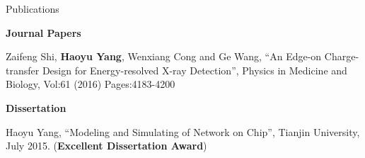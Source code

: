 \begin{rSection}{Publications}


\textbf{Journal Papers}
\begin{description}[font=\normalfont]
\item[{[J1]}]{
    Zaifeng Shi, \textbf{Haoyu Yang}, Wenxiang Cong and Ge Wang,
    ``An Edge-on Charge-transfer Design for Energy-resolved X-ray Detection'', Physics in Medicine and Biology, 
    Vol:61 (2016) Pages:4183-4200
}

\end{description}




\textbf{Dissertation}
\begin{description}[font=\normalfont]
\item[{[B.Eng.]}]{
    Haoyu Yang,
    ``Modeling and Simulating of Network on Chip'',
    Tianjin University, July 2015.
    (\textbf{Excellent Dissertation Award})
}
\end{description}





\end{rSection}

